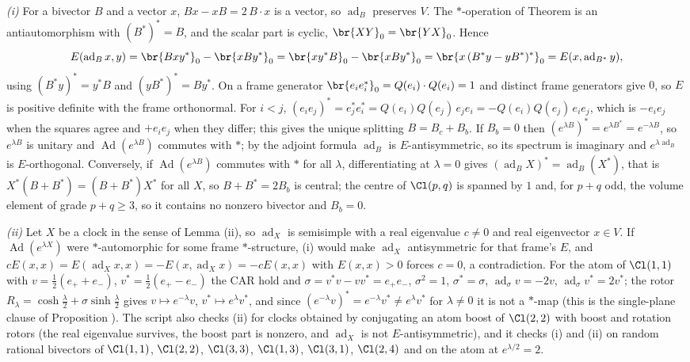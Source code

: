 \emph{(i)} For a bivector $B$ and a vector $x$, $Bx - xB = 2\,B \cdot x$ is a vector, so $\operatorname{ad}_{B}$ preserves $V$. The $*$-operation of Theorem  is an antiautomorphism with $(B^{*})^{*} = B$, and the scalar part is cyclic, $\br{XY}_{0} = \br{YX}_{0}$. Hence
\[
E(\operatorname{ad}_{B}x, y) = \br{Bxy^{*}}_{0} - \br{xBy^{*}}_{0} = \br{xy^{*}B}_{0} - \br{xBy^{*}}_{0} = \br{x\,(B^{*}y - yB^{*})^{*}}_{0} = E(x, \operatorname{ad}_{B^{*}}y),
\]
using $(B^{*}y)^{*} = y^{*}B$ and $(yB^{*})^{*} = By^{*}$. On a frame generator $\br{e_{i}e_{i}^{*}}_{0} = Q(e_{i})\cdot Q(e_{i}) = 1$ and distinct frame generators give $0$, so $E$ is positive definite with the frame orthonormal. For $i < j$, $(e_{i}e_{j})^{*} = e_{j}^{*}e_{i}^{*} = Q(e_{i})Q(e_{j})\,e_{j}e_{i} = -Q(e_{i})Q(e_{j})\,e_{i}e_{j}$, which is $-e_{i}e_{j}$ when the squares agree and $+e_{i}e_{j}$ when they differ; this gives the unique splitting $B = B_{c} + B_{b}$. If $B_{b} = 0$ then $(e^{\lambda B})^{*} = e^{\lambda B^{*}} = e^{-\lambda B}$, so $e^{\lambda B}$ is unitary and $\operatorname{Ad}(e^{\lambda B})$ commutes with $*$; by the adjoint formula $\operatorname{ad}_{B}$ is $E$-antisymmetric, so its spectrum is imaginary and $e^{\lambda\operatorname{ad}_{B}}$ is $E$-orthogonal. Conversely, if $\operatorname{Ad}(e^{\lambda B})$ commutes with $*$ for all $\lambda$, differentiating at $\lambda = 0$ gives $(\operatorname{ad}_{B}X)^{*} = \operatorname{ad}_{B}(X^{*})$, that is $X^{*}(B + B^{*}) = (B + B^{*})X^{*}$ for all $X$, so $B + B^{*} = 2B_{b}$ is central; the centre of $\Cl(p,q)$ is spanned by $1$ and, for $p + q$ odd, the volume element of grade $p + q \ge 3$, so it contains no nonzero bivector and $B_{b} = 0$.

\emph{(ii)} Let $X$ be a clock in the sense of Lemma (ii), so $\operatorname{ad}_{X}$ is semisimple with a real eigenvalue $c \neq 0$ and real eigenvector $x \in V$. If $\operatorname{Ad}(e^{\lambda X})$ were $*$-automorphic for some frame $*$-structure, (i) would make $\operatorname{ad}_{X}$ antisymmetric for that frame's $E$, and $cE(x,x) = E(\operatorname{ad}_{X}x, x) = -E(x, \operatorname{ad}_{X}x) = -cE(x,x)$ with $E(x,x) > 0$ forces $c = 0$, a contradiction. For the atom of $\Cl(1,1)$ with $v = \tfrac12(e_{+} + e_{-})$, $v^{*} = \tfrac12(e_{+} - e_{-})$ the CAR hold and $\sigma = v^{*}v - vv^{*} = e_{+}e_{-}$, $\sigma^{2} = 1$, $\sigma^{*} = \sigma$, $\operatorname{ad}_{\sigma}v = -2v$, $\operatorname{ad}_{\sigma}v^{*} = 2v^{*}$; the rotor $R_{\lambda} = \cosh\tfrac{\lambda}{2} + \sigma\sinh\tfrac{\lambda}{2}$ gives $v \mapsto e^{-\lambda}v$, $v^{*} \mapsto e^{\lambda}v^{*}$, and since $(e^{-\lambda}v)^{*} = e^{-\lambda}v^{*} \neq e^{\lambda}v^{*}$ for $\lambda \neq 0$ it is not a $*$-map (this is the single-plane clause of Proposition ). The script also checks (ii) for clocks obtained by conjugating an atom boost of $\Cl(2,2)$ with boost and rotation rotors (the real eigenvalue survives, the boost part is nonzero, and $\operatorname{ad}_{X}$ is not $E$-antisymmetric), and it checks (i) and (ii) on random rational bivectors of $\Cl(1,1)$, $\Cl(2,2)$, $\Cl(3,3)$, $\Cl(1,3)$, $\Cl(3,1)$, $\Cl(2,4)$ and on the atom at $e^{\lambda/2} = 2$.

